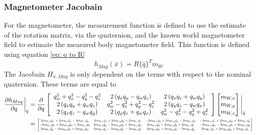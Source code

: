 \subsubsection{Magnetometer Jacobain}
For the magnetometer, the measurement function is defined to use the estimate of the rotation matrix, via the quaternion, and the known world magnetometer field to estimate the measured body magnetometer field. This function is defined using equation \eqref{eq: q to R}
\begin{equation}
    h_{Mag}(\bar{x}) = R{\{\bar{q}\}}^T m_W
    \label{eq: h mag quat}
\end{equation}
The Jacobain $H_{x,Mag}$ is only dependent on the terms with respect to the nominal quaternion. These terms are equal to 
\begin{equation}
    \begin{split}
            \frac{\partial h_{Mag}}{\partial q} \bigg|_{\bar{q}} 
            &= \frac{\partial}{\partial q} \left[\begin{array}{ccc}
            q_w^2+q_x^2-q_y^2-q_z^2 & 2\left(q_x q_y-q_w q_z\right) & 2\left(q_x q_z+q_w q_y\right) \\ 
            2\left(q_x q_y+q_w q_z\right) & q_w^2-q_x^2+q_y^2-q_z^2 & 2\left(q_y q_z-q_w q_x\right) \\ 
            2\left(q_x q_z-q_w q_y\right) & 2\left(q_y q_z+q_w q_x\right) & q_w^2-q_x^2-q_y^2+q_z^2
            \end{array}\right] \begin{bmatrix}
            m_{W,x} \\
            m_{W,y} \\
            m_{W,z} 
        \end{bmatrix}
        \Bigg|_{\bar{q}} \\
            &= \resizebox{\textwidth}{!}{$
            \left[\begin{matrix}
            2 m_{W,x} \bar{q}_{w} + 2 m_{W,y} \bar{q}_{z} - 2 m_{W,z} \bar{q}_{y} & 2 m_{W,x} \bar{q}_{x} + 2 m_{W,y} \bar{q}_{y} + 2 m_{W,z} \bar{q}_{z} & - 2 m_{W,x} \bar{q}_{y} + 2 m_{W,y} \bar{q}_{x} - 2 m_{W,z} \bar{q}_{w} & - 2 m_{W,x} \bar{q}_{z} + 2 m_{W,y} \bar{q}_{w} + 2 m_{W,z} \bar{q}_{x}\\
            - 2 m_{W,x} \bar{q}_{z} + 2 m_{W,y} \bar{q}_{w} + 2 m_{W,z} \bar{q}_{x} & 2 m_{W,x} \bar{q}_{y} - 2 m_{W,y} \bar{q}_{x} + 2 m_{W,z} \bar{q}_{w} & 2 m_{W,x} \bar{q}_{x} + 2 m_{W,y} \bar{q}_{y} + 2 m_{W,z} \bar{q}_{z} & - 2 m_{W,x} \bar{q}_{w} - 2 m_{W,y} \bar{q}_{z} + 2 m_{W,z} \bar{q}_{y}\\
            2 m_{W,x} \bar{q}_{y} - 2 m_{W,y} \bar{q}_{x} + 2 m_{W,z} \bar{q}_{w} & 2 m_{W,x} \bar{q}_{z} - 2 m_{W,y} \bar{q}_{w} - 2 m_{W,z} \bar{q}_{x} & 2 m_{W,x} \bar{q}_{w} + 2 m_{W,y} \bar{q}_{z} - 2 m_{W,z} \bar{q}_{y} & 2 m_{W,x} \bar{q}_{x} + 2 m_{W,y} \bar{q}_{y} + 2 m_{W,z} \bar{q}_{z}
            \end{matrix}\right]
            $}
    \end{split}
    \label{eq: dh dq}
\end{equation}
